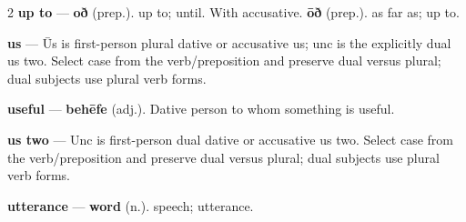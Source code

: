 \begin{multicols}{2}
\textbf{up to} — \textbf{oð} (prep.). up to; until. With accusative. \textbf{ōð} (prep.). as far as; up to.\par
\textbf{us} — Ūs is first-person plural dative or accusative us; unc is the explicitly dual us two. Select case from the verb/preposition and preserve dual versus plural; dual subjects use plural verb forms.\par
\textbf{useful} — \textbf{behēfe} (adj.). Dative person to whom something is useful.\par
\textbf{us two} — Unc is first-person dual dative or accusative us two. Select case from the verb/preposition and preserve dual versus plural; dual subjects use plural verb forms.\par
\textbf{utterance} — \textbf{word} (n.). speech; utterance.\par

\end{multicols}
